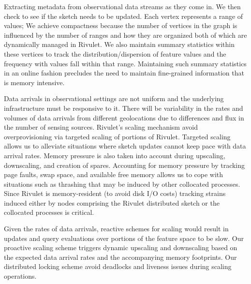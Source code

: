 \begin{description}[leftmargin=*]
\item[RQ-1:] Extracting metadata from observational data streams as they come in. We then check to see if the sketch needs to be updated. Each vertex represents a range of values; 
We achieve compactness because the number of vertices in the graph is influenced by the number of ranges and how they are organized both of which are dynamically managed in Rivulet.  We also maintain summary statistics within these vertices to track the distribution/dispersion of feature values and the frequency with values fall within that range. Maintaining such summary statistics in an online fashion precludes the need to maintain fine-grained information that is memory intensive.

\item[RQ-2:] Data arrivals in observational settings are not uniform and the underlying infrastructure must be responsive to it.  There will be variability in the rates and volumes of data arrivals from different geolocations due to differences and flux in the number of sensing sources. Rivulet’s scaling mechanism avoid overprovisioning via targeted scaling of portions of Rivulet. 
Targeted scaling allows us to alleviate situations where sketch updates cannot keep pace with data arrival rates.  Memory pressure is also taken into account during upscaling, downscaling, and creation of spares. Accounting for memory pressure by tracking page faults, swap space, and available free memory allows us to cope with situations such as thrashing that may be induced by other collocated processes. Since Rivulet is memory-resident (to avoid disk I/O costs) tracking strains induced either by nodes comprising the Rivulet distributed sketch or the collocated processes is critical.

Given the rates of data arrivals, reactive schemes for scaling would result in updates and query evaluations over portions of the feature space to be slow. Our proactive scaling scheme triggers dynamic upscaling and downscaling based on the expected data arrival rates and the accompanying memory footprints. Our distributed locking scheme avoid deadlocks and liveness issues during scaling operations.


\end{description}
